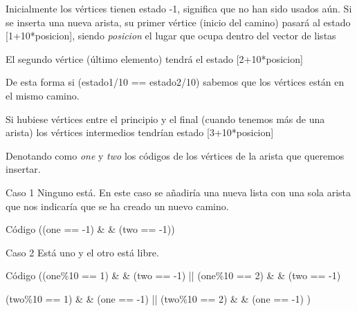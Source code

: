 \begin{frame}
	\begin{block}{ }
	Inicialmente los vértices tienen estado -1, significa que no han sido usados aún.
	Si se inserta una nueva arista, su primer vértice (inicio del camino) pasará al estado
	[1+10*posicion], siendo \textit{posicion} el lugar que ocupa dentro del vector de
	listas 
	
	El segundo vértice (último elemento) tendrá el estado [2+10*posicion]

	De esta forma si (estado1/10 == estado2/10) sabemos que los vértices están en el mismo 
	camino.
	\end{block}
	
	\begin{block}{ }
	Si hubiese vértices entre el principio y el final (cuando tenemos más de una arista) 
	los vértices intermedios tendrían estado [3+10*posicion]
	\end{block}
\end{frame}

\begin{frame}
	\begin{block}
	Denotando como \textit{one} y \textit{two} los códigos de los vértices de la arista 
	que queremos insertar.
	\end{block}
\end{frame}
	
\begin{frame}
	\begin{block}{Caso 1}
	Ninguno está. En este caso se añadiría una nueva lista
	con una sola arista que nos indicaría que se ha creado un nuevo camino.
	\end{block}
	
	\begin{exampleblock}{Código}
	\hspace{1cm}((one == -1) \& \& (two == -1))
	\end{exampleblock}
\end{frame}	
	
\begin{frame}
	\begin{block}{Caso 2}
	Está uno y el otro está libre.
	\end{block}
	
	\begin{exampleblock}{Código} 
	\hspace{1cm}((one\%10 == 1) \& \& (two == -1) || (one\%10 == 2) \& \& (two == -1)    
	
	\hspace{1cm}(two\%10 == 1) \& \& (one == -1) || (two\%10 == 2) \& \& (one == -1) )
	\end{exampleblock}
\end{frame}

